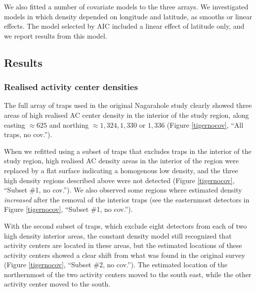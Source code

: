 \documentclass[10pt,a4paper]{article}
\begin{document}
We also fitted a number of covariate models to the three arrays. We investigated models in which density depended on longitude and latitude, as smooths or linear effects. The model selected by AIC included a linear effect of latitude only, and we report results from this model. 


\subsection{Results} 

\subsubsection{Realised activity center densities}

The full array of traps used in the original Nagarahole study clearly showed three areas of high realised AC center density in the interior of the study region, along easting $\approx 625$ and northing $\approx 1,324, 1,330$ or $1,336$ (Figure \ref{tigernocov}, ``All traps, no cov.''). 

When we refitted using a subset of traps that excludes traps in the interior of the study region, high realised AC density areas in the interior of the region were replaced by a flat surface indicating a homogenous low density, and the three high density regions described above were not detected  (Figure \ref{tigernocov}, ``Subset \#1, no cov.''). We also observed some regions where estimated density {\it increased} after the removal of the interior traps (see the easternmost detectors in Figure \ref{tigernocov}, ``Subset \#1, no cov.''). %

With the second subset of traps, which exclude eight detectors from each of two high density interior areas, the constant density model still recognized that activity centers are located in these areas, but the estimated locations of these activity centers showed a clear shift from what was found in the original survey (Figure \ref{tigernocov}, ``Subset \#2, no cov.''). The estimated location of the northernmost of the two activity centers moved to the south east, while the other activity center moved to the south.
\end{document}
